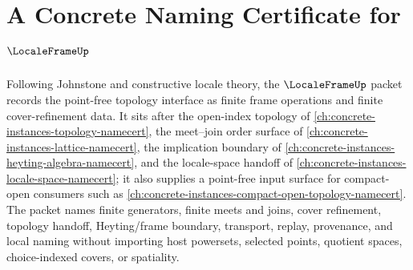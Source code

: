\chapter{A Concrete Naming Certificate for $\LocaleFrameUp$}
\label{ch:concrete-instances-locale-frame-namecert}

Following Johnstone and constructive locale theory, the $\LocaleFrameUp$ packet records the point-free topology interface as finite frame operations and finite cover-refinement data. It sits after the open-index topology of \autoref{ch:concrete-instances-topology-namecert}, the meet--join order surface of \autoref{ch:concrete-instances-lattice-namecert}, the implication boundary of \autoref{ch:concrete-instances-heyting-algebra-namecert}, and the locale-space handoff of \autoref{ch:concrete-instances-locale-space-namecert}; it also supplies a point-free input surface for compact-open consumers such as \autoref{ch:concrete-instances-compact-open-topology-namecert}. The packet names finite generators, finite meets and joins, cover refinement, topology handoff, Heyting/frame boundary, transport, replay, provenance, and local naming without importing host powersets, selected points, quotient spaces, choice-indexed covers, or spatiality.

